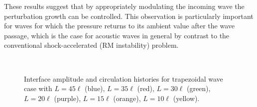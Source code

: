 These results suggest that by appropriately modulating the incoming
wave the perturbation growth can be controlled. This observation is
particularly important for waves for which the pressure returns to
its ambient value after the wave passage, which is the case for
acoustic waves in general by contrast to the conventional
shock-accelerated (\ac{RM} instability) problem.



\begin{figure}
  \centering
  \begin{subfigure}{0.48\textwidth}
    \centering
    \label{fig:trapz_interface_multi-lag} 
  \end{subfigure}
  ~
  \begin{subfigure}{0.48\textwidth}
    \centering
    \label{fig:trapz_circ_multi-lag}%
  \end{subfigure}
  \caption[The interface and circulation dependence on wave
    duration]{Interface amplitude
     and circulation
     histories for trapezoidal wave
    case with $L=45\ell$ (blue), $L=35\ell$ (red), $L=30\ell$
    (green), $L=20\ell$ (purple), $L=15\ell$ (orange), $L=10\ell$
    (yellow).}
  \label{fig:trapz_circ_interface_multi-lag}
\end{figure}
%

